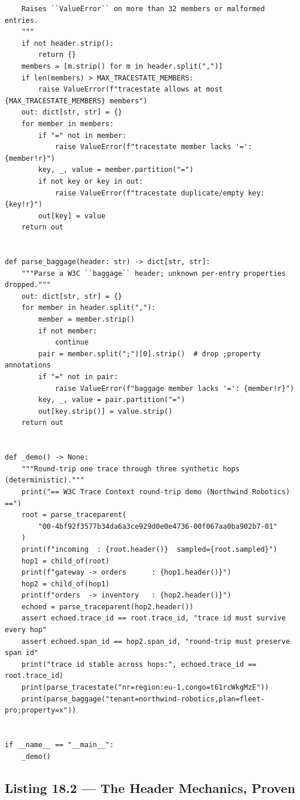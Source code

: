 \begin{verbatim}
    Raises ``ValueError`` on more than 32 members or malformed entries.
    """
    if not header.strip():
        return {}
    members = [m.strip() for m in header.split(",")]
    if len(members) > MAX_TRACESTATE_MEMBERS:
        raise ValueError(f"tracestate allows at most {MAX_TRACESTATE_MEMBERS} members")
    out: dict[str, str] = {}
    for member in members:
        if "=" not in member:
            raise ValueError(f"tracestate member lacks '=': {member!r}")
        key, _, value = member.partition("=")
        if not key or key in out:
            raise ValueError(f"tracestate duplicate/empty key: {key!r}")
        out[key] = value
    return out


def parse_baggage(header: str) -> dict[str, str]:
    """Parse a W3C ``baggage`` header; unknown per-entry properties dropped."""
    out: dict[str, str] = {}
    for member in header.split(","):
        member = member.strip()
        if not member:
            continue
        pair = member.split(";")[0].strip()  # drop ;property annotations
        if "=" not in pair:
            raise ValueError(f"baggage member lacks '=': {member!r}")
        key, _, value = pair.partition("=")
        out[key.strip()] = value.strip()
    return out


def _demo() -> None:
    """Round-trip one trace through three synthetic hops (deterministic)."""
    print("== W3C Trace Context round-trip demo (Northwind Robotics) ==")
    root = parse_traceparent(
        "00-4bf92f3577b34da6a3ce929d0e0e4736-00f067aa0ba902b7-01"
    )
    print(f"incoming  : {root.header()}  sampled={root.sampled}")
    hop1 = child_of(root)
    print(f"gateway -> orders      : {hop1.header()}")
    hop2 = child_of(hop1)
    print(f"orders  -> inventory   : {hop2.header()}")
    echoed = parse_traceparent(hop2.header())
    assert echoed.trace_id == root.trace_id, "trace id must survive every hop"
    assert echoed.span_id == hop2.span_id, "round-trip must preserve span id"
    print("trace id stable across hops:", echoed.trace_id == root.trace_id)
    print(parse_tracestate("nr=region:eu-1,congo=t61rcWkgMzE"))
    print(parse_baggage("tenant=northwind-robotics,plan=fleet-pro;property=x"))


if __name__ == "__main__":
    _demo()
\end{verbatim}

\subsection{Listing 18.2 --- The Header Mechanics, Proven}
\label{subsec:ch18-listing-traceparent-tests}

